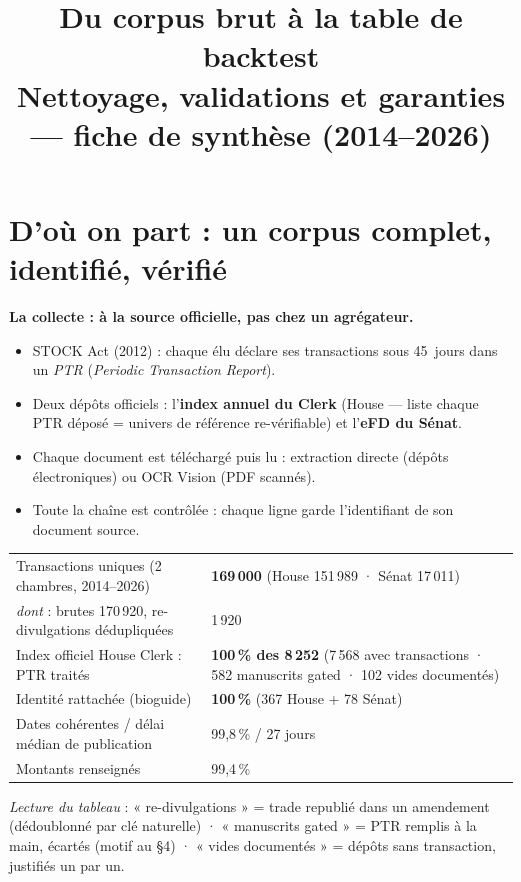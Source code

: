 \documentclass[10pt,a4paper]{article}
\title{\vspace{-1.2em}\textbf{Du corpus brut à la table de backtest}\\
\large Nettoyage, validations et garanties --- fiche de synthèse (2014--2026)}
\author{}
\date{}
\begin{document}
\maketitle
\vspace{-2.2em}

\section{D'où on part : un corpus complet, identifié, vérifié}

\textbf{La collecte : à la source officielle, pas chez un agrégateur.}
\begin{itemize}
\item STOCK Act (2012) : chaque élu déclare ses transactions sous 45~jours dans un \emph{PTR}
      (\emph{Periodic Transaction Report}).
\item Deux dépôts officiels : l'\textbf{index annuel du Clerk} (House --- liste chaque PTR déposé =
      univers de référence re-vérifiable) et l'\textbf{eFD du Sénat}.
\item Chaque document est téléchargé puis lu : extraction directe (dépôts électroniques) ou OCR Vision
      (PDF scannés).
\item Toute la chaîne est contrôlée : chaque ligne garde l'identifiant de son document source.
\end{itemize}

\begin{center}\small
\begin{tabular}{p{7.6cm}p{8.6cm}}
\toprule
Transactions uniques (2 chambres, 2014--2026) & \textbf{169\,000} \quad (House 151\,989 · Sénat 17\,011) \\
\quad\emph{dont} : brutes 170\,920, re-divulgations dédupliquées & 1\,920 \\
Index officiel House Clerk : PTR traités & \textbf{100\,\% des 8\,252} (7\,568 avec transactions · 582 manuscrits gated · 102 vides documentés) \\
Identité rattachée (bioguide) & \textbf{100\,\%} (367 House + 78 Sénat) \\
Dates cohérentes / délai médian de publication & 99{,}8\,\% / 27 jours \\
Montants renseignés & 99{,}4\,\% \\
\bottomrule
\end{tabular}
\end{center}

\emph{Lecture du tableau} : « re-divulgations » = trade republié dans un amendement (dédoublonné par clé
naturelle) · « manuscrits gated » = PTR remplis à la main, écartés (motif au \S4) · « vides documentés »
= dépôts sans transaction, justifiés un par un.
\end{document}
